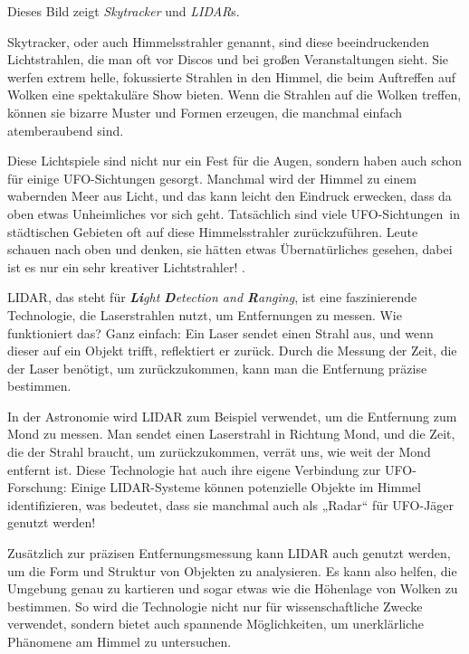 \documentclass{scrartcl}
\begin{document}
Dieses Bild zeigt \textit{Skytracker} und \textit{LIDAR}s.

Skytracker, oder auch Himmelsstrahler genannt, sind diese beeindruckenden Lichtstrahlen, die man oft vor Discos und bei großen Veranstaltungen sieht. Sie werfen extrem helle, fokussierte Strahlen in den Himmel, die beim Auftreffen auf Wolken eine spektakuläre Show bieten. Wenn die Strahlen auf die Wolken treffen, können sie bizarre Muster und Formen erzeugen, die manchmal einfach atemberaubend sind.

Diese Lichtspiele sind nicht nur ein Fest für die Augen, sondern haben auch schon für einige UFO-Sichtungen gesorgt. Manchmal wird der Himmel zu einem wabernden Meer aus Licht, und das kann leicht den Eindruck erwecken, dass da oben etwas Unheimliches vor sich geht. Tatsächlich sind viele \frq UFO-Sichtungen\flq\ in städtischen Gebieten oft auf diese Himmelsstrahler zurückzuführen. Leute schauen nach oben und denken, sie hätten etwas Übernatürliches gesehen, dabei ist es nur ein sehr kreativer Lichtstrahler! .

LIDAR, das steht für \textit{\textbf{Li}ght \textbf{D}etection and \textbf{R}anging}, ist eine faszinierende Technologie, die Laserstrahlen nutzt, um Entfernungen zu messen. Wie funktioniert das? Ganz einfach: Ein Laser sendet einen Strahl aus, und wenn dieser auf ein Objekt trifft, reflektiert er zurück. Durch die Messung der Zeit, die der Laser benötigt, um zurückzukommen, kann man die Entfernung präzise bestimmen.

In der Astronomie wird LIDAR zum Beispiel verwendet, um die Entfernung zum Mond zu messen. Man sendet einen Laserstrahl in Richtung Mond, und die Zeit, die der Strahl braucht, um zurückzukommen, verrät uns, wie weit der Mond entfernt ist. Diese Technologie hat auch ihre eigene Verbindung zur UFO-Forschung: Einige LIDAR-Systeme können potenzielle Objekte im Himmel identifizieren, was bedeutet, dass sie manchmal auch als „Radar“ für UFO-Jäger genutzt werden!

Zusätzlich zur präzisen Entfernungsmessung kann LIDAR auch genutzt werden, um die Form und Struktur von Objekten zu analysieren. Es kann also helfen, die Umgebung genau zu kartieren und sogar etwas wie die Höhenlage von Wolken zu bestimmen. So wird die Technologie nicht nur für wissenschaftliche Zwecke verwendet, sondern bietet auch spannende Möglichkeiten, um unerklärliche Phänomene am Himmel zu untersuchen.  
\end{document}
